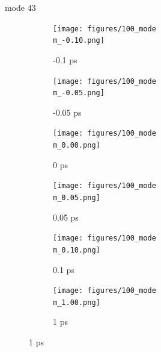 \documentclass{beamer}
\newcommand\w{0.32}
\begin{document}
\renewcommand\m{43}
\begin{frame}{mode \m}
	\begin{figure}
		\centering
		\begin{subfigure}[b]{\w\textwidth}
			\centering
			\texttt{[image: figures/100\_mode\\m\_-0.10.png]}
			\caption{-0.1 ps}
		\end{subfigure}
		\begin{subfigure}[b]{\w\textwidth}
			\centering
			\texttt{[image: figures/100\_mode\\m\_-0.05.png]}
			\caption{-0.05 ps}
		\end{subfigure}
		\begin{subfigure}[b]{\w\textwidth}
			\centering
			\texttt{[image: figures/100\_mode\\m\_0.00.png]}
			\caption{0 ps}
		\end{subfigure}
		\begin{subfigure}[b]{\w\textwidth}
			\centering
			\texttt{[image: figures/100\_mode\\m\_0.05.png]}
			\caption{0.05 ps}
		\end{subfigure}
		\begin{subfigure}[b]{\w\textwidth}
			\centering
			\texttt{[image: figures/100\_mode\\m\_0.10.png]}
			\caption{0.1 ps}
		\end{subfigure}
		\begin{subfigure}[b]{\w\textwidth}
			\centering
			\texttt{[image: figures/100\_mode\\m\_1.00.png]}
			\caption{1 ps}
		\end{subfigure}
	\end{figure}
\end{frame}
\end{document}
